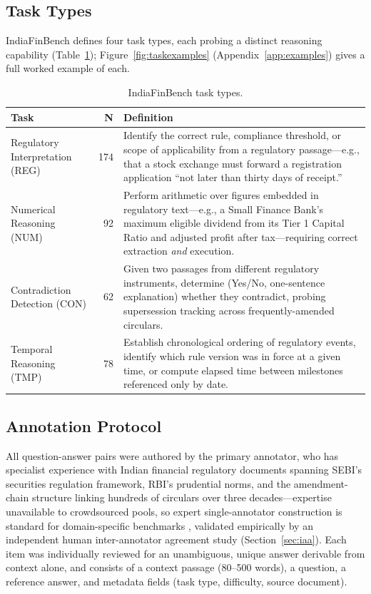\subsection{Task Types}

IndiaFinBench defines four task types, each probing a distinct reasoning capability
(Table~\ref{tab:tasktypes}); Figure~\ref{fig:taskexamples} (Appendix~\ref{app:examples}) gives a
full worked example of each.

\begin{table}[t]
\centering\small
\begin{tabular}{lrp{9.7cm}}
\toprule
\textbf{Task} & \textbf{N} & \textbf{Definition} \\
\midrule
Regulatory Interpretation (REG) & 174 & Identify the correct rule, compliance threshold, or scope
of applicability from a regulatory passage---e.g., that a stock exchange must forward a registration
application ``not later than thirty days of receipt.'' \\
Numerical Reasoning (NUM) & 92 & Perform arithmetic over figures embedded in regulatory
text---e.g., a Small Finance Bank's maximum eligible dividend from its Tier 1 Capital Ratio and
adjusted profit after tax---requiring correct extraction \emph{and} execution. \\
Contradiction Detection (CON) & 62 & Given two passages from different regulatory instruments,
determine (Yes/No, one-sentence explanation) whether they contradict, probing supersession
tracking across frequently-amended circulars. \\
Temporal Reasoning (TMP) & 78 & Establish chronological ordering of regulatory events, identify
which rule version was in force at a given time, or compute elapsed time between milestones
referenced only by date. \\
\bottomrule
\end{tabular}
\caption{IndiaFinBench task types.}
\label{tab:tasktypes}
\end{table}

\subsection{Annotation Protocol}

All question-answer pairs were authored by the primary annotator, who has specialist experience with
Indian financial regulatory documents spanning SEBI's securities regulation framework, RBI's
prudential norms, and the amendment-chain structure linking hundreds of circulars over three
decades---expertise unavailable to crowdsourced pools, so expert single-annotator construction is
standard for domain-specific benchmarks \citep{hendrycks2021cuad, malik2021ildc,
islam2023financebench}, validated empirically by an independent human inter-annotator agreement
study (Section~\ref{sec:iaa}). Each item was individually reviewed for an unambiguous, unique answer
derivable from context alone, and consists of a context passage (80--500 words), a question, a
reference answer, and metadata fields (task type, difficulty, source document).

